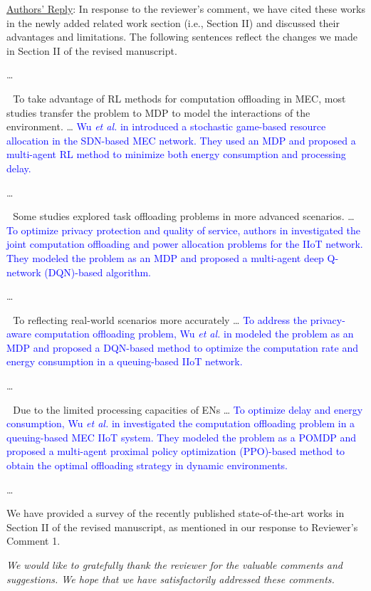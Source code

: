 \documentclass[12pt,draftclsnofoot,onecolumn]{IEEEtran}
\newcommand{\rev}[1]{{\color{blue}#1}} %
\newcommand{\rev}[1]{#1}
\newenvironment{my}[2]%
{\begin{list}{}%
{\setlength{\rightmargin}{#1}\setlength{\leftmargin}{#2}}%


 \item[]{}

} {\end{list}}
\begin{document}
\begin{enumerate}
	\underline{Authors' Reply}: In response to the reviewer's comment, we have cited these works in the newly added related work section (i.e., Section II) and discussed their advantages and limitations. The following sentences reflect the changes we made in Section II of the revised manuscript.
	
	\begin{my}{1cm}{1cm}
		\rev{
			{
				\color{black}

				
				\dots
				
				\,\,\,\,To take advantage of RL methods for computation offloading in MEC, most studies transfer the problem to MDP to model the interactions of the environment.
				\dots
					\textcolor{blue}{Wu \textit{et al.} in \cite{wu2023computation} introduced a stochastic game-based resource allocation in the SDN-based MEC network. They used an MDP and proposed a multi-agent RL method to minimize both energy consumption and processing delay.}
				
				
				\dots
				
				\,\,\,\,Some studies explored task offloading problems in more advanced scenarios. \dots 
					\textcolor{blue}{To optimize privacy protection and quality of service, authors in \cite{wu2024privacy} investigated the joint computation offloading and power allocation problems for the IIoT network. They modeled the problem as an MDP and proposed a multi-agent deep Q-network (DQN)-based algorithm.}
				
				\dots 
				
				\,\,\,\,To reflecting real-world scenarios more accurately \dots 
					\textcolor{blue}{To address the privacy-aware computation offloading problem, Wu \textit{et al.} in \cite{wu2024combining} modeled the problem as an MDP and proposed a DQN-based method to optimize the computation rate and energy consumption in a queuing-based IIoT network.}
				
				
				\dots 
				
				\,\,\,\,Due to the limited processing capacities of ENs  \dots
					\textcolor{blue}{To optimize delay and energy consumption, Wu \textit{et al.} in \cite{wu2023multi} investigated the computation offloading problem in a queuing-based MEC IIoT system. They modeled the problem as a POMDP and proposed a multi-agent proximal policy optimization (PPO)-based method to obtain the optimal offloading strategy in dynamic environments.}
				
				\dots
				
				
				
		}}
	\end{my}\vspace{6mm}

We have provided a survey of the recently published state-of-the-art works in Section II of the revised manuscript, as mentioned in our response to Reviewer's Comment 1.\newline


	
\end{enumerate}

\vspace{10mm}

\textit{We would like to gratefully thank the reviewer for the valuable comments and suggestions. We hope that we have satisfactorily addressed these comments.}\newline
\end{document}
